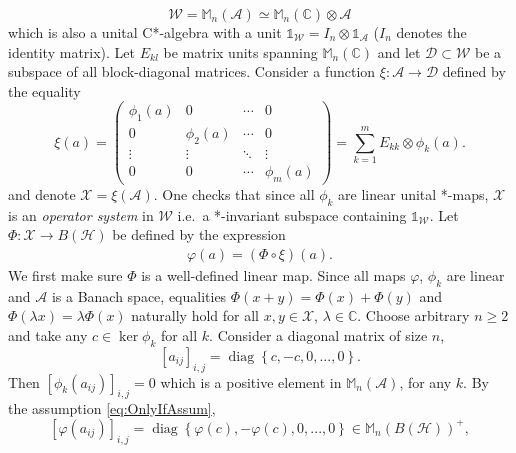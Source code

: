 \documentclass[reqno]{amsart}
\theoremstyle{plain}
\numberwithin{equation}{section}
\numberwithin{theorem}{section}
\numberwithin{lemma}{section}
\numberwithin{definition}{section}
\numberwithin{corollary}{section}
\numberwithin{remark}{section}
\newcommand{\complexes}{\mathbb{C}}
\newcommand{\hilbert}{\mathcal{H}}
\newcommand{\matr}[1]{\mathbb{M}_{#1}(\complexes)}
\newcommand{\matra}[2]{\mathbb{M}_{#1}(#2)}
\newcommand{\unit}{\mathds{1}}
\begin{document}
\begin{equation}\label{eq:WdefinitionCstar}
    \mathscr{W} = \matra{n}{\mathscr{A}} \simeq \matr{n} \otimes \mathscr{A}
\end{equation}
which is also a unital C*-algebra with a unit $\unit_\mathscr{W} = I_n \otimes \unit_\mathscr{A}$ ($I_n$ denotes the identity matrix). Let $E_{kl}$ be matrix units spanning $\matr{n}$ and let $\mathscr{D} \subset \mathscr{W}$ be a subspace of all block-diagonal matrices. Consider a function $\xi : \mathscr{A}\to\mathscr{D}$ defined by the equality
\begin{equation}\label{eq:xiDef}
    \xi(a) = \left(\begin{array}{cccc}
        \phi_1(a) & 0 & \cdots & 0\\
        0 & \phi_2(a) & \cdots & 0\\
        \vdots & \vdots & \ddots & \vdots \\
        0 & 0 & \cdots & \phi_m(a)
    \end{array}
\right) = \sum_{k=1}^{m} E_{kk}\otimes \phi_k(a).
\end{equation}
and denote $\mathscr{X} = \xi (\mathscr{A})$. One checks that since all $\phi_k$ are linear unital *-maps, $\mathscr{X}$ is an \emph{operator system} in $\mathscr{W}$ i.e.~a *-invariant subspace containing $\unit_\mathscr{W}$. Let $\Phi : \mathscr{X} \to B(\hilbert)$ be defined by the expression
\begin{align}\label{eq:PhiDef}
    \varphi(a) = \left(\Phi\circ\xi\right)(a).
\end{align}
We first make sure $\Phi$ is a well-defined linear map. Since all maps $\varphi$, $\phi_k$ are linear and $\mathscr{A}$ is a Banach space, equalities $\Phi(x+y) = \Phi(x) + \Phi(y)$ and $\Phi(\lambda x) = \lambda\Phi(x)$ naturally hold for all $x,y\in\mathscr{X}$, $\lambda\in\complexes$. Choose arbitrary $n \geqslant 2$ and take any $c\in\ker{\phi_k}$ for all $k$. Consider a diagonal matrix of size $n$,
\begin{equation}
    \left[a_{ij}\right]_{i,j} = \operatorname{diag}{\left\{ c,-c,0,...,0 \right\}}.
\end{equation}
Then $\left[\phi_k (a_{ij})\right]_{i,j} = 0$ which is a positive element in $\matra{n}{\mathscr{A}}$, for any $k$. By the assumption \eqref{eq:OnlyIfAssum},
\begin{equation}
    \left[\varphi(a_{ij})\right]_{i,j} = \operatorname{diag}{\left\{\varphi (c),-\varphi(c),0,...,0\right\}} \in \matra{n}{B(\hilbert)}^+ ,
\end{equation}
\end{document}

